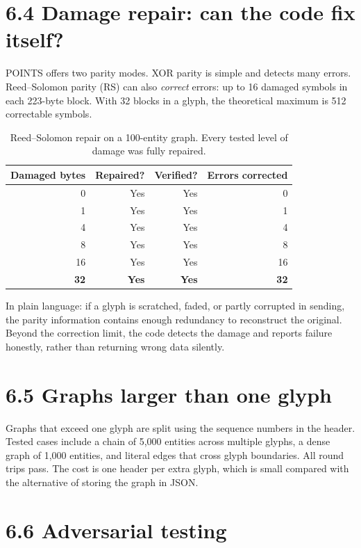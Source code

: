 \section*{6.4 Damage repair: can the code fix itself?}

POINTS offers two parity modes. XOR parity is simple and detects many errors. Reed--Solomon parity (RS) can also \textit{correct} errors: up to 16 damaged symbols in each 223-byte block. With 32 blocks in a glyph, the theoretical maximum is 512 correctable symbols.

\begin{table}[ht]
\centering
\caption{Reed--Solomon repair on a 100-entity graph. Every tested level of damage was fully repaired.}
\label{tab:rs_recovery}
\begin{tabular}{rrrr}
\toprule
Damaged bytes & Repaired? & Verified? & Errors corrected \\
\midrule
0 & Yes & Yes & 0 \\
1 & Yes & Yes & 1 \\
4 & Yes & Yes & 4 \\
8 & Yes & Yes & 8 \\
16 & Yes & Yes & 16 \\
\textbf{32} & \textbf{Yes} & \textbf{Yes} & \textbf{32} \\
\bottomrule
\end{tabular}
\end{table}

In plain language: if a glyph is scratched, faded, or partly corrupted in sending, the parity information contains enough redundancy to reconstruct the original. Beyond the correction limit, the code detects the damage and reports failure honestly, rather than returning wrong data silently.

\section*{6.5 Graphs larger than one glyph}

Graphs that exceed one glyph are split using the sequence numbers in the header. Tested cases include a chain of 5,000 entities across multiple glyphs, a dense graph of 1,000 entities, and literal edges that cross glyph boundaries. All round trips pass. The cost is one header per extra glyph, which is small compared with the alternative of storing the graph in JSON.

\section*{6.6 Adversarial testing}

